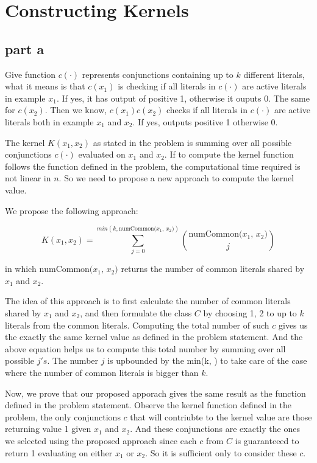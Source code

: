 \section{Constructing Kernels}

\subsection{part a}

Give function $c(\cdot)$ represents conjunctions containing up to $k$ different literals, what it means is that $c(x_1)$ is checking if all literals in $c(\cdot)$ are active literals in example $x_1$. If yes, it has output of positive 1, otherwise it ouputs 0. The same for $c(x_2)$. Then we know, $c(x_1)c(x_2)$ checks if all literals in $c(\cdot)$ are active literals both in example $x_1$ and $x_2$. If yes, outputs positive 1 otherwise 0.

The kernel $K(x_1, x_2)$ as stated in the problem is summing over all possible conjunctions $c(\cdot)$ evaluated on $x_1$ and $x_2$. If to compute the kernel function follows the function defined in the problem, the computational time required is not linear in $n$. So we need to propose a new approach to compute the kernel value.

We propose the following approach:

\begin{equation}
K(x_1,x_2) = \sum_{j=0}^{min(k, \text{numCommon($x_1$, $x_2$)}) } {\text{numCommon($x_1$, $x_2$)} \choose j}
\end{equation}

in which $\text{numCommon($x_1$, $x_2$)}$ returns the number of common literals shared by $x_1$ and $x_2$.

The idea of this approach is to first calculate the number of common literals shared by $x_1$ and $x_2$, and then formulate the class $C$ by choosing 1, 2 to up to $k$ literals from the common literals. Computing the total number of such $c$ gives us the exactly the same kernel value as defined in the problem statement. And the above equation helps us to compute this total number by summing over all possible $j's$. The number $j$ is upbounded by the min(k, ) to take care of the case where the number of common literals is bigger than $k$.

Now, we prove that our proposed apporach gives the same result as the function defined in the problem statement. Observe the kernel function defined in the problem, the only conjunctions $c$ that will contriubte to the kernel value are those returning value 1 given $x_1$ and $x_2$. And these conjunctions are exactly the ones we selected using the proposed approach since each $c$ from $C$ is guaranteeed to return 1 evaluating on either $x_1$ or $x_2$. So it is sufficient only to consider these $c$.

